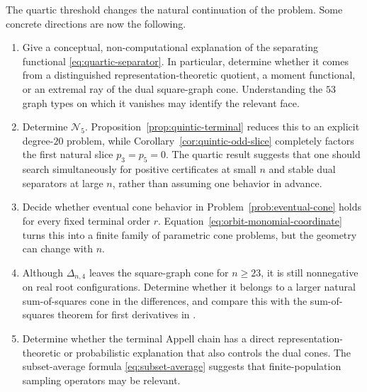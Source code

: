 \documentclass[11pt]{amsart}
\numberwithin{equation}{section}
\begin{document}
The quartic threshold changes the natural continuation of the problem.  Some
concrete directions are now the following.

\begin{enumerate}[label={\rm(\arabic*)}]
\item Give a conceptual, non-computational explanation of the separating
functional \eqref{eq:quartic-separator}.  In particular, determine whether it
comes from a distinguished representation-theoretic quotient, a moment
functional, or an extremal ray of the dual square-graph cone.  Understanding
the $53$ graph types on which it vanishes may identify the relevant face.

\item Determine $\mathcal N_5$.  Proposition~\ref{prop:quintic-terminal}
reduces this to an explicit degree-$20$ problem, while
Corollary~\ref{cor:quintic-odd-slice} completely factors the first natural
slice $p_3=p_5=0$.  The quartic result suggests that one should search
simultaneously for positive certificates at small $n$ and stable dual
separators at large $n$, rather than assuming one behavior in advance.

\item Decide whether eventual cone behavior in
Problem~\ref{prob:eventual-cone} holds for every fixed terminal order $r$.
Equation~\eqref{eq:orbit-monomial-coordinate} turns this into a finite family
of parametric cone problems, but the geometry can change with $n$.

\item Although $\Delta_{n,4}$ leaves the square-graph cone for $n\ge23$, it is
still nonnegative on real root configurations.  Determine whether it belongs
to a larger natural sum-of-squares cone in the differences, and compare this
with the sum-of-squares theorem for first derivatives in \cite{Sanyal}.

\item Determine whether the terminal Appell chain has a direct
representation-theoretic or probabilistic explanation that also controls the
dual cones.  The subset-average formula \eqref{eq:subset-average} suggests that
finite-population sampling operators may be relevant.
\end{enumerate}
\end{document}
